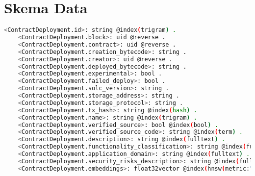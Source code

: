 \chapter{Skema Data}
\label{appendix:skema-data}

\begin{lstlisting}[language=bash]
    <ContractDeployment.id>: string @index(trigram) .
    <ContractDeployment.block>: uid @reverse .
    <ContractDeployment.contract>: uid @reverse .
    <ContractDeployment.creation_bytecode>: string .
    <ContractDeployment.creator>: uid @reverse .
    <ContractDeployment.deployed_bytecode>: string .
    <ContractDeployment.experimental>: bool .
    <ContractDeployment.failed_deploy>: bool .
    <ContractDeployment.solc_version>: string .
    <ContractDeployment.storage_address>: string .
    <ContractDeployment.storage_protocol>: string .
    <ContractDeployment.tx_hash>: string @index(hash) .
    <ContractDeployment.name>: string @index(trigram) .
    <ContractDeployment.verified_source>: bool @index(bool) .
    <ContractDeployment.verified_source_code>: string @index(term) .
    <ContractDeployment.description>: string @index(fulltext) .
    <ContractDeployment.functionality_classification>: string @index(fulltext) .
    <ContractDeployment.application_domain>: string @index(fulltext) .
    <ContractDeployment.security_risks_description>: string @index(fulltext) .
    <ContractDeployment.embeddings>: float32vector @index(hnsw(metric:"euclidean")) .
\end{lstlisting}

